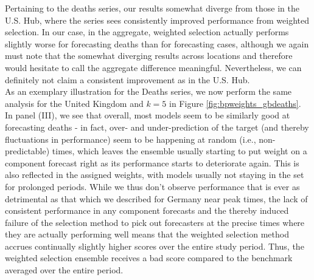 Pertaining to the deaths series, our results somewhat diverge from those in the U.S. Hub, where the series sees consistently improved performance from weighted selection. In our case, in the aggregate, weighted selection actually performs slightly worse for forecasting deaths than for forecasting cases, although we again must note that the somewhat diverging results across locations and therefore would hesitate to call the aggregate difference meaningful. Nevertheless, we can definitely not claim a consistent improvement as in the U.S. Hub.\\
As an exemplary illustration for the Deaths series, we now perform the same analysis for the United Kingdom and $k = 5$ in Figure \ref{fig:bpweights_gbdeaths}. In panel (III), we see that overall, most models seem to be similarly good at forecasting deaths - in fact, over- and under-prediction of the target (and thereby fluctuations in performance) seem to be happening at random (i.e., non-predictable) times, which leaves the ensemble usually starting to put weight on a component forecast right as its performance starts to deteriorate again. This is also reflected in the assigned weights, with models usually not staying in the set for prolonged periods. While we thus don't observe performance that is ever as detrimental as that which we described for Germany near peak times, the lack of consistent performance in any component forecasts and the thereby induced failure of the selection method to pick out forecasters at the precise times where they are actually performing well means that the weighted selection method accrues continually slightly higher scores over the entire study period. Thus, the weighted selection ensemble receives a bad score compared to the benchmark averaged over the entire period.\\
